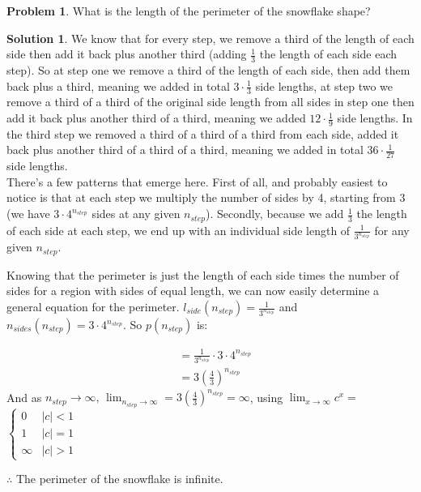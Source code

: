 \documentclass[10pt]{article}
\theoremstyle{definition}
\newtheorem{problem}{Problem}
\newtheorem{soln}{Solution}
\begin{document}
\begin{problem}
What is the length of the perimeter of the snowflake shape?
\end{problem}
\begin{soln}
    We know that for every step, we remove a third of the length of each side then add it back plus another third (adding $\frac{1}{3}$ the length of each side each step).
    So at step one we remove a third of the length of each side, then add them back plus a third, meaning we added in total $3\cdot\frac{1}{3}$ side lengths,
    at step two we remove a third of a third of the original side length from all sides in step one then add it back plus another third of a third,
    meaning we added $12\cdot\frac{1}{9}$ side lengths. In the third step we removed a third of a third of a third from each side, added it back plus
    another third of a third of a third, meaning we added in total $36\cdot\frac{1}{27}$ side lengths.\\

    There's a few patterns that emerge here. First of all, and probably easiest to notice is that at each step we multiply the number of sides by 4,
    starting from 3 (we have $3\cdot 4^{n_{step}}$ sides at any given $n_{step}$). Secondly, because we add $\frac{1}{3}$ the length of each side at each step,
    we end up with an individual side length of $\frac{1}{3^{n_{step}}}$ for any given $n_{step}$.

    Knowing that the perimeter is just the length of each side times the number of sides for a region with sides of equal length, we can now easily determine a general equation for the perimeter.
    $l_{side}(n_{step})=\frac{1}{3^{n_{step}}}$ and $n_{sides}(n_{step})=3\cdot 4^{n_{step}}$. So $p({n_{step}})$ is:

    \begin{align*}
         & = \frac{1}{3^{n_{step}}} \cdot 3\cdot 4^{n_{step}} \\
         & = 3\left(\frac{4}{3}\right)^{n_{step}}
    \end{align*}
    \noindent And as $n_{step}\to \infty, \, \lim_{n_{step} \to \infty} = 3\left(\frac{4}{3}\right)^{n_{step}}=\infty$, using $\lim_{x \to \infty} c^x=$ $\begin{cases}
            0      & |c|< 1 \\
            1      & |c|= 1 \\
            \infty & |c|> 1
        \end{cases}$
    \begin{center}
        $\therefore$ The perimeter of the snowflake is infinite.
    \end{center}
\end{soln}
\end{document}
